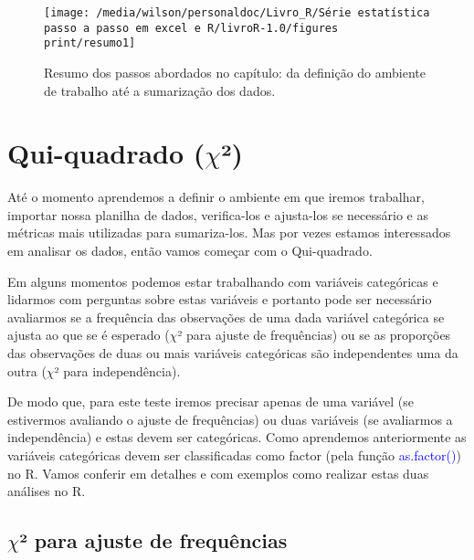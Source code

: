 \documentclass[14pt,titlepage, oneside, openany, a4paper]{book}
\begin{document}
\begin{figure}[H]
\texttt{[image: /media/wilson/personaldoc/Livro\_R/Série estatística passo a passo em excel e R/livroR-1.0/figures print/resumo1]} \caption{Resumo dos passos abordados no capítulo: da definição do ambiente de trabalho até a sumarização dos dados.}\label{fig:resumo1}
\end{figure}

\hypertarget{qui-quadrado-chi}{%
\chapter{\texorpdfstring{Qui-quadrado (\(\chi\)²)}{Qui-quadrado (\textbackslash{}chi²)}}\label{qui-quadrado-chi}}

Até o momento aprendemos a definir o ambiente em que iremos trabalhar, importar nossa planilha de dados, verifica-los e ajusta-los se necessário e as métricas mais utilizadas para sumariza-los. Mas por vezes estamos interessados em analisar os dados, então vamos começar com o Qui-quadrado.

Em alguns momentos podemos estar trabalhando com variáveis categóricas e lidarmos com perguntas sobre estas variáveis e portanto pode ser necessário avaliarmos se a frequência das observações de uma dada variável categórica se ajusta ao que se é esperado (\(\chi\)² para ajuste de frequências) ou se as proporções das observações de duas ou mais variáveis categóricas são independentes uma da outra (\(\chi\)² para independência).

De modo que, para este teste iremos precisar apenas de uma variável (se estivermos avaliando o ajuste de frequências) ou duas variáveis (se avaliarmos a independência) e estas devem ser categóricas. Como aprendemos anteriormente as variáveis categóricas devem ser classificadas como factor (pela função \textcolor{blue}{as.factor()}) no R. Vamos conferir em detalhes e com exemplos como realizar estas duas análises no R.

\hypertarget{chi-para-ajuste-de-frequuxeancias}{%
\section{\texorpdfstring{\(\chi\)² para ajuste de frequências}{\textbackslash{}chi² para ajuste de frequências}}\label{chi-para-ajuste-de-frequuxeancias}}
\end{document}
